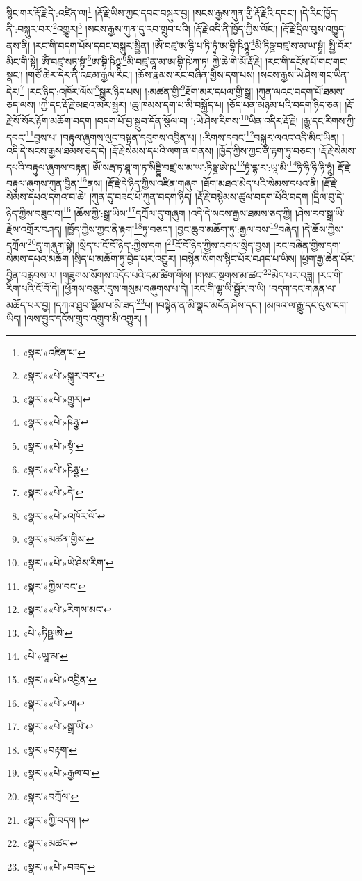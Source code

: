 སྙིང་གར་རྡོ་རྗེ་དེ་:འཛིན་ལ།\footnote{«སྣར་»འཛིན་པ།} །རྡོ་རྗེ་ཡིས་ཀྱང་དབང་བསྐུར་བྱ། །སངས་རྒྱས་ཀུན་གྱི་རྡོ་རྗེའི་དབང་། །དེ་རིང་ཁྱོད་ནི་:བསྐུར་བར་\footnote{«སྣར་»«པེ་»སྐུར་བར་}འགྱུར།\footnote{«སྣར་»«པེ་»གྱུར།} །སངས་རྒྱས་ཀུན་དུ་རབ་གྲུབ་པའི། །རྡོ་རྗེ་འདི་ནི་ཁྱོད་ཀྱིས་ལོང་། །རྡོ་རྗེ་དྲིལ་བུས་འཁྱུད་ནས་ནི། །རང་གི་བདག་པོས་དབང་བསྐུར་སྦྱིན། །ཨོཾ་བཛྲ་ཨ་དྷི་པ་ཏི་ཏྭཾ་ཨ་བྷི་ཥིཉྩཱ་\footnote{«སྣར་»«པེ་»ཥིཉྩ་}མི་ཏིཥྛ་བཛྲ་ས་མ་ཡ་སྟྭཾ། སྤྱི་བོར་མིང་གི་སྟེ། ཨོཾ་བཛྲ་སཏྭ་སྟྭཾ་\footnote{«སྣར་»«པེ་»སྟཾ་}ཨ་བྷི་ཥིཉྩཱ་\footnote{«སྣར་»«པེ་»ཥིཉྩ་}མི་བཛྲ་ནཱ་མ་ཨ་བྷི་ཥེ་ཀ་ཏ། ཀྱེ་ཆེ་གེ་མོ་རྡོ་རྗེ། །རང་གི་དངོས་པོ་གང་གང་སྣང་། །གཙོ་ཆེར་དེར་ནི་འཇམ་རྒྱལ་རང་། །ཆོས་རྣམས་རང་བཞིན་གྱིས་དག་པས། །སངས་རྒྱས་ཡེ་ཤེས་གང་ཡིན་དེར།\footnote{«སྣར་»«པེ་»དེ།} །རང་ཉིད་:འཁོར་ལོས་\footnote{«སྣར་»«པེ་»འཁོར་ལོ་}སྒྱུར་ཉིད་པས། །:མཚན་གྱི་\footnote{«སྣར་»མཚན་གྱིས་}ཐོག་མར་དཔལ་གྱི་སྒྲ། །ཀུན་ལའང་བདག་པོ་ཐམས་ཅད་ལས། །ཀྱེ་དང་རྡོ་རྗེ་མཐའ་མར་སྦྱར། །ཆུ་ཁམས་དག་པ་མི་བསྐྱོད་པ། །ཅོད་པན་མཉམ་པའི་བདག་ཉིད་ཅན། །རྡོ་རྗེ་སོ་སོར་རྟོག་མཆོག་བདག །བདག་པོ་བྱ་སྒྲུབ་དོན་སྩོལ་བ། །:ཡེ་ཤེས་རིགས་\footnote{«སྣར་»«པེ་»ཡེ་ཤེས་རིག་}ཡིན་འདིར་རྡོ་རྗེ། །རྒྱུ་དང་རིགས་ཀྱི་དབང་\footnote{«སྣར་»ཀྱིས་བང་}བྱས་པ། །བརྟུལ་ཞུགས་ལུང་བསྟན་དབུགས་འབྱིན་པ། །:རིགས་དབང་\footnote{«སྣར་»«པེ་»རིགས་མང་}བསྐུར་ལའང་འདི་མིང་ཡིན། །འདི་དེ་སངས་རྒྱས་ཐམས་ཅད་དེ། །རྡོ་རྗེ་སེམས་དཔའི་ལག་ན་གནས། །ཁྱོད་ཀྱིས་ཀྱང་ནི་རྟག་ཏུ་བཅང་། །རྡོ་རྗེ་སེམས་དཔའི་བརྟུལ་ཞུགས་བརྟན། ཨོཾ་སརྦ་ཏ་ཐཱ་ག་ཏ་སིདྡྷི་བཛྲ་ས་མ་ཡ་:ཏིཥྛ་ཨེ་ཥ་\footnote{«པེ་»ཏིཥྛ་ཨེ་}ཏྭཾ་དྷ་ར་:ཡཱ་མི་\footnote{«པེ་»ཡཱ་མ་}ཧི་ཧི་ཧི་ཧི་ཧཱུཾ། རྡོ་རྗེ་བརྟུལ་ཞུགས་ཀུན་བྱིན་\footnote{«སྣར་»«པེ་»འབྱིན་}ནས། །རྡོ་རྗེ་དེ་ཉིད་ཀྱིས་འཛིན་གཞུག །ཐོག་མཐའ་མེད་པའི་སེམས་དཔའ་ནི། །རྡོ་རྗེ་སེམས་དཔའ་དགའ་བ་ཆེ། །ཀུན་དུ་བཟང་པོ་ཀུན་བདག་ཉིད། །རྡོ་རྗེ་བསྙེམས་ཚུལ་བདག་པོའི་བདག །དྲིལ་བུ་དེ་ཉིད་ཀྱིས་བཟུང་བ།\footnote{«སྣར་»«པེ་»ལ།} །ཆོས་ཀྱི་:སྒྲ་ཡིས་\footnote{«སྣར་»«པེ་»སྒྲ་ཡི་}དཀྲོལ་དུ་གཞུག །འདི་དེ་སངས་རྒྱས་ཐམས་ཅད་ཀྱི། །ཤེས་རབ་སྒྲ་ཡི་རྗེས་འགྲོར་བཤད། །ཁྱོད་ཀྱིས་ཀྱང་ནི་རྟག་\footnote{«སྣར་»བརྟག་}ཏུ་བཅང་། །བྱང་ཆུབ་མཆོག་ཏུ་:རྒྱལ་བས་\footnote{«སྣར་»«པེ་»རྒྱལ་བ་}བཞེད། །དེ་ཆོས་ཀྱིས་དཀྲོལ་\footnote{«སྣར་»བཀྲོལ་}དུ་གཞུག་སྟེ། །སྲིད་པ་ངོ་བོ་ཉིད་:ཀྱིས་དག །\footnote{«སྣར་»ཀྱི་བདག །}ངོ་བོ་ཉིད་ཀྱིས་འགལ་སྲིད་བྱས། །རང་བཞིན་གྱིས་དག་སེམས་དཔའ་མཆོག །སྲིད་པ་མཆོག་ཏུ་བྱེད་པར་འགྱུར། །བསྙེན་སོགས་སྙིང་པོར་བཤད་པ་ཡིས། །ཕྱག་རྒྱ་ཆེན་པོར་བྱིན་བརླབས་ལ། །གཟུགས་སོགས་འདོད་པའི་དམ་ཚིག་གིས། །གསང་སྔགས་མ་ཚང་\footnote{«སྣར་»མཚང་}མེད་པར་བཟླ། །རང་གི་རིག་པའི་ངོ་བོ་དེ། །ཕྱོགས་བཅུར་དུས་གསུམ་བཞུགས་པ་དེ། །རང་གི་ལྷ་ཡི་སྦྱོར་བ་ཡི། །བདག་དང་གཞན་ལ་མཆོད་པར་བྱ། །དཀའ་ཐུབ་སྡོམ་པ་མི་ཟད་\footnote{«སྣར་»«པེ་»བཟད་}པ། །བསྟེན་ན་མི་སྣང་མངོན་ཤེས་དང་། །མཁའ་ལ་རྒྱུ་དང་ལུས་ངག་ཡིད། །ལས་བྱུང་དངོས་གྲུབ་འགྲུབ་མི་འགྱུར། །
